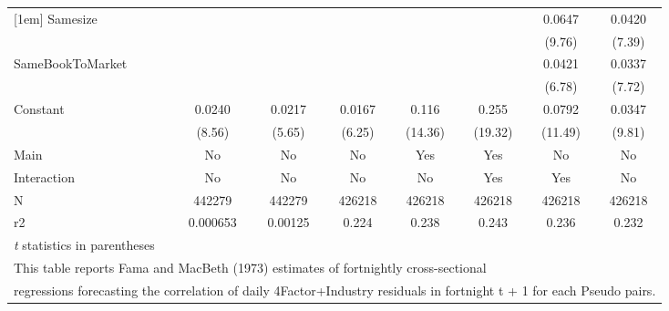 {\begin{tabular}{l*{7}{c}}
[1em]
Samesize            &                     &                     &                     &                     &                     &      0.0647\sym{***}&      0.0420\sym{***}\\
                    &                     &                     &                     &                     &                     &      (9.76)         &      (7.39)         \\
[1em]
SameBookToMarket    &                     &                     &                     &                     &                     &      0.0421\sym{***}&      0.0337\sym{***}\\
                    &                     &                     &                     &                     &                     &      (6.78)         &      (7.72)         \\
[1em]
Constant            &      0.0240\sym{***}&      0.0217\sym{***}&      0.0167\sym{***}&       0.116\sym{***}&       0.255\sym{***}&      0.0792\sym{***}&      0.0347\sym{***}\\
                    &      (8.56)         &      (5.65)         &      (6.25)         &     (14.36)         &     (19.32)         &     (11.49)         &      (9.81)         \\
\hline
Main                &          No         &          No         &          No         &         Yes         &         Yes         &          No         &          No         \\
Interaction         &          No         &          No         &          No         &          No         &         Yes         &         Yes         &          No         \\
N                   &      442279         &      442279         &      426218         &      426218         &      426218         &      426218         &      426218         \\
r2                  &    0.000653         &     0.00125         &       0.224         &       0.238         &       0.243         &       0.236         &       0.232         \\
\hline\hline
\multicolumn{8}{l}{\footnotesize \textit{t} statistics in parentheses}\\
\multicolumn{8}{l}{\footnotesize This table reports Fama and MacBeth (1973) estimates of fortnightly cross-sectional}\\
\multicolumn{8}{l}{\footnotesize  regressions forecasting the correlation of daily 4Factor+Industry residuals in fortnight t + 1 for each Pseudo pairs.}\\

\end{tabular}}
